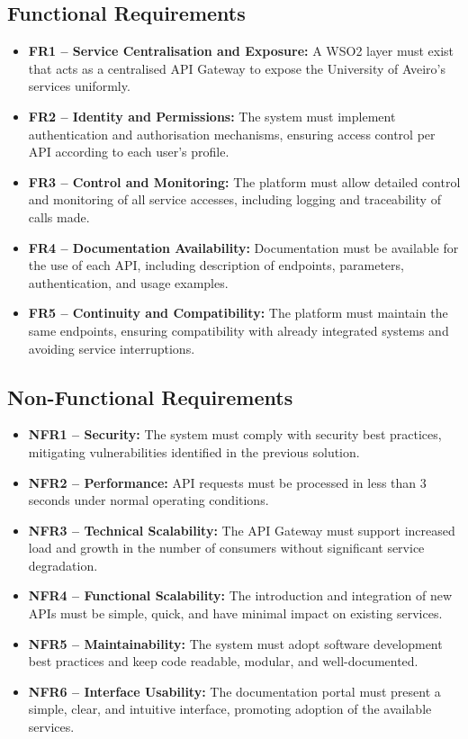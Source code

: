 \documentclass[12pt, a4paper]{report}
\begin{document}
\subsection{Functional Requirements}
\begin{itemize}
    \item \textbf{FR1 -- Service Centralisation and Exposure:} A WSO2 layer must exist
          that acts as a centralised API Gateway to expose the University of Aveiro's
          services uniformly.
    \item \textbf{FR2 -- Identity and Permissions:} The system must implement
          authentication and authorisation mechanisms, ensuring access control per API
          according to each user's profile.
    \item \textbf{FR3 -- Control and Monitoring:} The platform must allow detailed
          control and monitoring of all service accesses, including logging and
          traceability of calls made.
    \item \textbf{FR4 -- Documentation Availability:} Documentation must be available
          for the use of each API, including description of endpoints, parameters,
          authentication, and usage examples.
    \item \textbf{FR5 -- Continuity and Compatibility:} The platform must maintain the
          same endpoints, ensuring compatibility with already integrated systems and
          avoiding service interruptions.
\end{itemize}

\subsection{Non-Functional Requirements}
\begin{itemize}
    \item \textbf{NFR1 -- Security:} The system must comply with security best
          practices, mitigating vulnerabilities identified in the previous solution.
    \item \textbf{NFR2 -- Performance:} API requests must be processed in less than
          3 seconds under normal operating conditions.
    \item \textbf{NFR3 -- Technical Scalability:} The API Gateway must support
          increased load and growth in the number of consumers without significant
          service degradation.
    \item \textbf{NFR4 -- Functional Scalability:} The introduction and integration
          of new APIs must be simple, quick, and have minimal impact on existing services.
    \item \textbf{NFR5 -- Maintainability:} The system must adopt software development
          best practices and keep code readable, modular, and well-documented.
    \item \textbf{NFR6 -- Interface Usability:} The documentation portal must present
          a simple, clear, and intuitive interface, promoting adoption of the available
          services.
\end{itemize}
\end{document}
